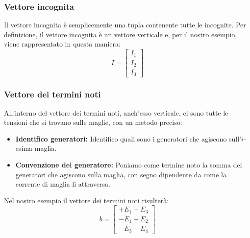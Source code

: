 \subsubsection*{Vettore incognita}

Il vettore incognita è semplicemente una tupla contenente tutte le incognite. Per definizione, il vettore incognita è un vettore verticale e, per il nostro esempio, viene rappresentato in questa maniera:
\begin{equation}
    I = 
    \begin{bmatrix}
    I_1      \\
    I_2    \\
    I_3      
    \end{bmatrix}
\end{equation}

\subsubsection*{Vettore dei termini noti}

All'interno del vettore dei termini noti, anch'esso verticale, ci sono tutte le tensioni che si trovano sulle maglie, con un metodo preciso:
\begin{itemize}
    \item \textbf{Identifico generatori:} Identifico quali sono i generatori che agiscono sull'$i$-esima maglia.
    \item \textbf{Convenzione del generatore:} Poniamo come termine noto la somma dei generatori che agiscono sulla maglia, con segno dipendente da come la corrente di maglia li attraversa. 
\end{itemize}

Nel nostro esempio il vettore dei termini noti risulterà:
\begin{equation}
    b = 
    \begin{bmatrix}
        + E_1 + E_3 \\
        - E_1 - E_2 \\
        - E_3 - E_4
    \end{bmatrix}
\end{equation}

